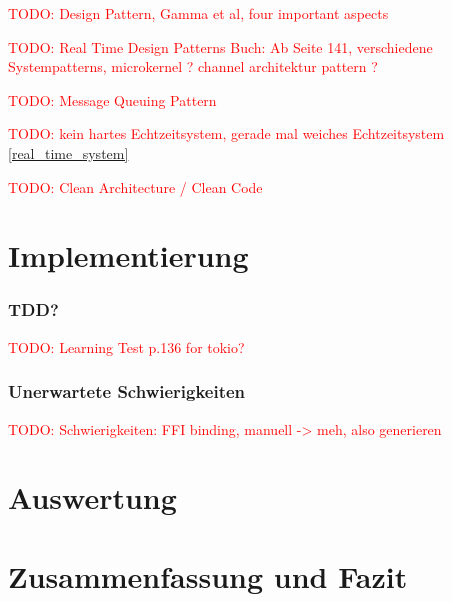 \documentclass[
	12pt,
	table,
	bigheadings,
	ngerman,
	a4paper,
	BCOR5mm,
	DIV14,
	1.1headlines,
	pagesize,
	oneside,
	openright,
	titlepage,
	headsepline,
	nochapterprefix,
	bibtotoc,
	tocindent,
	listsindent,
	pointlessnumbers,
	cleardoubleempty,
	fleqn,
	halfparskip
]{scrbook}
\newcommand{\todo}[1]{\textcolor{red}{TODO: #1}}
\begin{document}
		\todo{Design Pattern, Gamma et al, four important aspects}
		
		\todo{Real Time Design Patterns Buch: Ab Seite 141, verschiedene Systempatterns, microkernel \cite[151]{douglass2003real}? channel architektur pattern \cite[167]{douglass2003real}?}
		
		\todo{Message Queuing Pattern \cite[207]{douglass2003real}}
		
		\todo{kein hartes Echtzeitsystem, gerade mal weiches Echtzeitsystem \autoref{real_time_system}}
		
		\todo{Clean Architecture / Clean Code}
	
	\chapter{Implementierung}
		\subsection{TDD?}
		\todo{Learning Test p.136 for tokio?}
		\subsection{Unerwartete Schwierigkeiten}
		\label{impl:issue:ffi}
			\todo{Schwierigkeiten: FFI binding, manuell -> meh, also generieren}
			
			
	\chapter{Auswertung}
	
	\chapter{Zusammenfassung und Fazit}
	
	
	
	
	\clearpage
	\normalem
	\printbibliography
	
	\clearpage
	\printglossary[type=\acronymtype]

	\clearpage
	\listoffigures
	\lstlistoflistings
	
	
\end{document}
